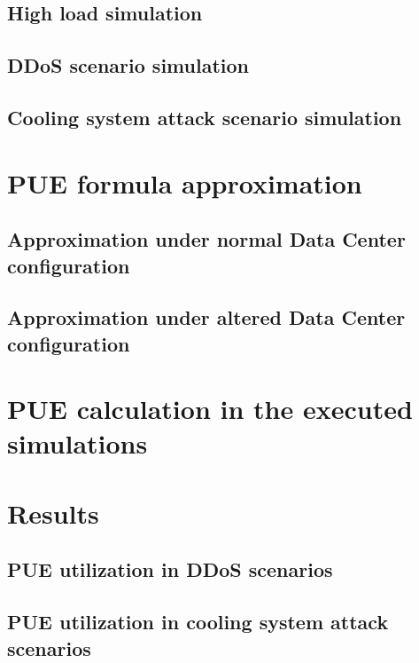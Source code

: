 \subsection{High load simulation}

\subsection{DDoS scenario simulation}

\subsection{Cooling system attack scenario simulation}

\section{PUE formula approximation}

\subsection{Approximation under normal Data Center configuration}

\subsection{Approximation under altered Data Center configuration}

\section{PUE calculation in the executed simulations}\label{section:puecalculation_tool}

\section{Results}

\subsection{PUE utilization in DDoS scenarios}

\subsection{PUE utilization in cooling system attack scenarios}

